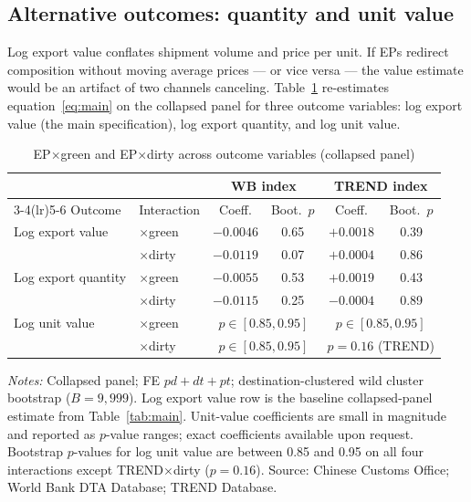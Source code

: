 \documentclass[12pt]{article}
\begin{document}


\subsection{Alternative outcomes: quantity and unit value}

Log export value conflates shipment volume and price per unit. If EPs redirect
composition without moving average prices --- or vice versa --- the value estimate would
be an artifact of two channels canceling. Table~\ref{tab:outcomes} re-estimates
equation~\eqref{eq:main} on the collapsed panel for three outcome variables: log export
value (the main specification), log export quantity, and log unit value.

\begin{table}[htbp]
\centering
\caption{EP$\times$green and EP$\times$dirty across outcome variables (collapsed panel)}
\label{tab:outcomes}
\small
\begin{threeparttable}
\begin{tabular}{llcccc}
\toprule
 & & \multicolumn{2}{c}{WB index} & \multicolumn{2}{c}{TREND index} \\
\cmidrule(lr){3-4}\cmidrule(lr){5-6}
Outcome & Interaction & Coeff. & Boot.\ $p$ & Coeff. & Boot.\ $p$ \\
\midrule
Log export value   & $\times$green & $-0.0046$ & 0.65 & $+0.0018$ & 0.39 \\
                   & $\times$dirty & $-0.0119$ & 0.07 & $+0.0004$ & 0.86 \\
\addlinespace
Log export quantity & $\times$green & $-0.0055$ & 0.53 & $+0.0019$ & 0.43 \\
                    & $\times$dirty & $-0.0115$ & 0.25 & $-0.0004$ & 0.89 \\
\addlinespace
Log unit value     & $\times$green & \multicolumn{2}{c}{$p \in [0.85, 0.95]$} &
                                     \multicolumn{2}{c}{$p \in [0.85, 0.95]$} \\
                   & $\times$dirty & \multicolumn{2}{c}{$p \in [0.85, 0.95]$} &
                                     \multicolumn{2}{c}{$p = 0.16$ (TREND)} \\
\bottomrule
\end{tabular}
\begin{tablenotes}\footnotesize
\item \emph{Notes:} Collapsed panel; FE $pd + dt + pt$; destination-clustered wild cluster bootstrap
($B = 9{,}999$). Log export value row is the baseline collapsed-panel estimate from
Table~\ref{tab:main}. Unit-value coefficients are small in magnitude and reported as
$p$-value ranges; exact coefficients available upon request. Bootstrap $p$-values
for log unit value are between 0.85 and 0.95 on all four interactions except
TREND$\times$dirty ($p = 0.16$). Source: Chinese Customs Office; World Bank DTA Database; TREND Database.
\end{tablenotes}
\end{threeparttable}
\end{table}
\end{document}
